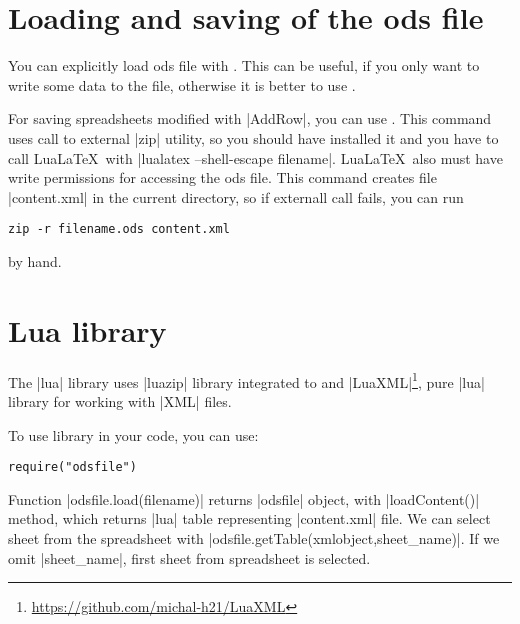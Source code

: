 \documentclass{ltxdoc}
\newcommand\ods{\textsf{ods}\xspace}
\begin{document}
\begin{LTXexample}
\begin{AddRow}
\end{AddRow} 
\begin{AddRow}[3]
\end{AddRow} 
\end{LTXexample}

\section{Loading and saving of the \ods file}

You can explicitly load \ods file with \marginpar{\cmd{\loadodsfile}}\cmd{\loadodsfile}. This can be useful, if you only want to write some data to the file, otherwise it is better to use .

For saving spreadsheets modified with |AddRow|, you can use \cmd{\savespreadsheet}\marginpar{\cmd{\savespreadsheet}}. This command uses call to external |zip| utility, so you should have installed it and you have to call Lua\LaTeX\ with |lualatex --shell-escape filename|. Lua\LaTeX\ also must have write permissions for accessing the \ods file. This command creates file |content.xml| in the current directory, so if externall call fails, you can run
\begin{verbatim}
zip -r filename.ods content.xml
\end{verbatim} 
by hand.
\section{Lua library}


The |lua| library uses |luazip| library integrated to \LuaTeX{} and |LuaXML|\footnote{\url{https://github.com/michal-h21/LuaXML}}, pure |lua| library for working with |XML| files.

To use library in your code, you can use:

\begin{verbatim}
require("odsfile")
\end{verbatim} 

Function |odsfile.load(filename)| returns |odsfile| object, with |loadContent()| method, which returns |lua| table representing |content.xml| file. We can select sheet from the spreadsheet with |odsfile.getTable(xmlobject,sheet_name)|. If we omit |sheet_name|, first sheet from spreadsheet is selected.
\end{document}
